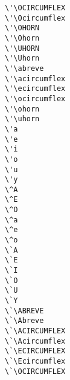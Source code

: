 \begin{multicols}{2}
\X{\'\OCIRCUMFLEX} \verb|\'\OCIRCUMFLEX| \\
\X{\'\Ocircumflex} \verb|\'\Ocircumflex| \\
\X{\'\OHORN} \verb|\'\OHORN| \\
\X{\'\Ohorn} \verb|\'\Ohorn| \\
\X{\'\UHORN} \verb|\'\UHORN| \\
\X{\'\Uhorn} \verb|\'\Uhorn| \\
\X{\'\abreve} \verb|\'\abreve| \\
\X{\'\acircumflex} \verb|\'\acircumflex| \\
\X{\'\ecircumflex} \verb|\'\ecircumflex| \\
\X{\'\ocircumflex} \verb|\'\ocircumflex| \\
\X{\'\ohorn} \verb|\'\ohorn| \\
\X{\'\uhorn} \verb|\'\uhorn| \\
 \verb|\'a| \\
 \verb|\'e| \\
 \verb|\'i| \\
 \verb|\'o| \\
 \verb|\'u| \\
 \verb|\'y| \\
 \verb|\^A| \\
 \verb|\^E| \\
 \verb|\^O| \\
 \verb|\^a| \\
 \verb|\^e| \\
 \verb|\^o| \\
 \verb|\`A| \\
 \verb|\`E| \\
 \verb|\`I| \\
 \verb|\`O| \\
 \verb|\`U| \\
 \verb|\`Y| \\
\X{\`\ABREVE} \verb|\`\ABREVE| \\
\X{\`\Abreve} \verb|\`\Abreve| \\
\X{\`\ACIRCUMFLEX} \verb|\`\ACIRCUMFLEX| \\
\X{\`\Acircumflex} \verb|\`\Acircumflex| \\
\X{\`\ECIRCUMFLEX} \verb|\`\ECIRCUMFLEX| \\
\X{\`\Ecircumflex} \verb|\`\Ecircumflex| \\
\X{\`\OCIRCUMFLEX} \verb|\`\OCIRCUMFLEX| \\

\end{multicols}
